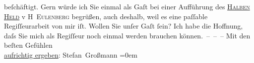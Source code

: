 \begin{ledgroupsized}[t]{13cm}
               beſchäftigt.\pend
           \pstart
           Gern würde ich Sie einmal als Gaſt bei einer Aufführung des \uline{\textsc{Halben Held}} v \textsc{H Eulenberg} begrüßen, auch deshalb, weil es eine paſſable Regiſſeurarbeit von mir iſt.
               Wollen Sie unſer Gaſt ſein?\pend
           \pstart
           Ich habe die Hoffnung, daſs Sie mich als Regiſſeur noch einmal werden brauchen
               können. – – –\pend
           \pstart
           Mit den beſten Gefühlen{\\[\baselineskip]}\uline{aufrichtig ergeben}: \spacefill\mbox{Stefan Großmann}\pend
           \leftskip=0em{}
         
         \endnumbering{}\end{ledgroupsized}  \newcommand{\dateiname}{L01920}\newcommand{\titel}{Stefan Großmann an Arthur Schnitzler, 31. 3. 1910}\newcommand{\editorInnen}{ Martin Anton Müller und Gerd-Hermann Susen}
      